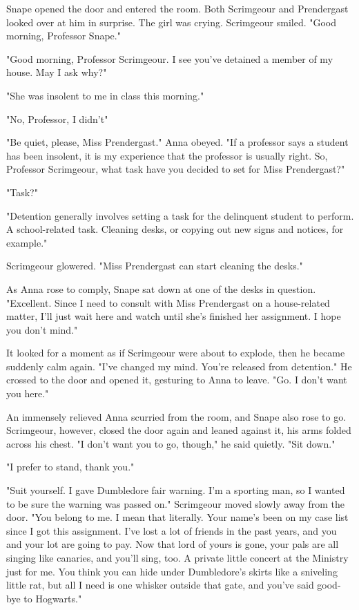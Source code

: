 Snape opened the door and entered the room. Both Scrimgeour and Prendergast looked over at him in surprise. The girl was crying. Scrimgeour smiled. "Good morning, Professor Snape."

"Good morning, Professor Scrimgeour. I see you've detained a member of my house. May I ask why?"

"She was insolent to me in class this morning."

"No, Professor, I didn't{\el}"

"Be quiet, please, Miss Prendergast." Anna obeyed. "If a professor says a student has been insolent, it is my experience that the professor is usually right. So, Professor Scrimgeour, what task have you decided to set for Miss Prendergast?"

"Task?"

"Detention generally involves setting a task for the delinquent student to perform. A school-related task. Cleaning desks, or copying out new signs and notices, for example."

Scrimgeour glowered. "Miss Prendergast can start cleaning the desks."

As Anna rose to comply, Snape sat down at one of the desks in question. "Excellent. Since I need to consult with Miss Prendergast on a house-related matter, I'll just wait here and watch until she's finished her assignment. I hope you don't mind."

It looked for a moment as if Scrimgeour were about to explode, then he became suddenly calm again. "I've changed my mind. You're released from detention." He crossed to the door and opened it, gesturing to Anna to leave. "Go. I don't want you here."

An immensely relieved Anna scurried from the room, and Snape also rose to go. Scrimgeour, however, closed the door again and leaned against it, his arms folded across his chest. "I don't want you to go, though," he said quietly. "Sit down."

"I prefer to stand, thank you."

"Suit yourself. I gave Dumbledore fair warning. I'm a sporting man, so I wanted to be sure the warning was passed on." Scrimgeour moved slowly away from the door. "You belong to me. I mean that literally. Your name's been on my case list since I got this assignment. I've lost a lot of friends in the past years, and you and your lot are going to pay. Now that lord of yours is gone, your pals are all singing like canaries, and you'll sing, too. A private little concert at the Ministry just for me. You think you can hide under Dumbledore's skirts like a sniveling little rat, but all I need is one whisker outside that gate, and you've said good-bye to Hogwarts."

